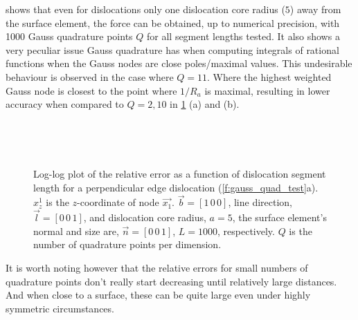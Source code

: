 shows that even for dislocations only one dislocation core radius ($5$) away from the surface element, the force can be obtained, up to numerical precision, with 1000 Gauss quadrature points $Q$ for all segment lengths tested. It also shows a very peculiar issue Gauss quadrature has when computing integrals of rational functions when the Gauss nodes are close poles/maximal values. This undesirable behaviour is observed in the case where $Q = 11$. Where the highest weighted Gauss node is closest to the point where $1/R_{a}$ is maximal, resulting in lower accuracy when compared to $Q = 2, 10$ in \cref{f:rel_err_perp_edge} (a) and (b).
\begin{figure}
  \centering
  ~

  ~
  \caption[Relative error for an edge dislocation perpendicular to a surface element.]{Log-log plot of the relative error as a function of dislocation segment length for a perpendicular edge dislocation (\cref{f:gauss_quad_test}a). $x^{1}_{z}$ is the $z$-coordinate of node $\vec{x_1}$. $\vec{b} = [1\, 0\, 0]$, line direction, $\vec{l} = [0\, 0\, 1]$, and dislocation core radius, $a = 5$, the surface element's normal and size are, $\vec{n} = [0\, 0\, 1]$, $L = 1000$, respectively. $Q$ is the number of quadrature points per dimension.}
  \label{f:rel_err_perp_edge}
\end{figure}
It is worth noting however that the relative errors for small numbers of quadrature points don't really start decreasing until relatively large distances. And when close to a surface, these can be quite large even under highly symmetric circumstances.

